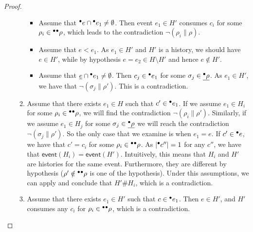 \documentclass{article}
\newcommand{\event}[1]{\ensuremath{\mathsf{event}(#1)}}
\newcommand{\confl}{\ensuremath{\mathord{\#}}}
\begin{document}
\begin{proof}
\begin{enumerate}[(a)]
\begin{enumerate}[1.]
\begin{itemize}
\item Assume that ${}^\bullet e \cap {}^\bullet e_1 \not= \emptyset$.  Then event $e_1
\in H'$ consumes $c_i$ for some $\rho_i \in {}^\bullet{}^\bullet\rho$, which leads to the
contradiction $\lnot (\rho_i \parallel \rho)$.

\item Assume that $e < e_1$.  As $e_1 \in H'$ and $H'$ is a history, we should
have $e \in H'$, while by hypothesis $e = e_2 \in H \setminus H'$ and hence $e
\notin H'$.

\item Assume that $\underline{e} \cap {}^\bullet e_1 \not= \emptyset$.  Then $c_j \in
{}^\bullet e_1$ for some $\sigma_j \in \underline{{}^\bullet\rho}$.  As $e_1 \in H'$, we have
that $\lnot (\sigma_j \parallel \rho')$.  This is a contradiction.
\end{itemize}

\item Assume that there exists $e_1 \in H$ such that $c' \in {}^\bullet e_1$.  If we
assume $e_1 \in H_i$ for some $\rho_i \in {}^\bullet{}^\bullet\rho$, we will find the
contradiction $\lnot (\rho_i \parallel \rho')$.  Similarly, if we assume $e_1
\in H_j$ for some $\sigma_j \in \underline{{}^\bullet\rho}$ we will reach the
contradiction $\lnot (\sigma_j \parallel \rho')$.  So the only case that we
examine is when $e_1 = e$.  If $c' \in {}^\bullet e$, we have that $c' = c_i$ for
some $\rho_i \in {}^\bullet{}^\bullet\rho$.  As $|{}^\bullet c''| = 1$ for any $c''$, we have
that $\event{H_i} = \event{H'}$.  Intuitively, this means that $H_i$ and $H'$
are histories for the same event.  Furthermore, they are different by
hypothesis ($\rho' \notin {}^\bullet{}^\bullet\rho$ is one of the hypothesis).  Under
this assumptions, we can apply  and conclude that $H' \confl H_i$,
which is a contradiction.

\item Assume that there exists $e_1 \in H'$ such that $c \in {}^\bullet e_1$.  Then
$e \in H'$, and $H'$ consumes any $c_i$ for $\rho_i \in {}^\bullet{}^\bullet\rho$, which
is a contradiction.
\end{enumerate}
\end{enumerate}
\end{proof}
\end{document}
